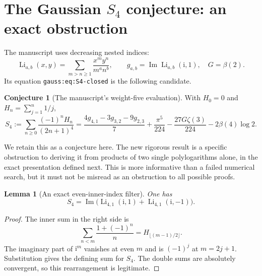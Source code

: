 \documentclass[11pt]{article}
\numberwithin{equation}{section}
\newtheorem{lemma}[theorem]{Lemma}
\theoremstyle{definition}
\newtheorem{conjecture}[theorem]{Conjecture}
\theoremstyle{remark}
\DeclareMathOperator{\Li}{Li}
\DeclareMathOperator{\Imm}{Im}
\newcommand{\ii}{\mathrm i}
\newcommand{\code}[1]{\texttt{\small #1}}
\begin{document}
\section{The Gaussian \texorpdfstring{$S_4$}{S4} conjecture: an exact obstruction}\label{sec:s4}

The manuscript uses decreasing nested indices:
\[
 \Li_{a,b}(x,y)=\sum_{m>n\ge1}\frac{x^my^n}{m^a n^b},\qquad
 g_{a,b}=\Imm\Li_{a,b}(\ii,1),\quad G=\beta(2).
\]
Its equation \code{gauss:eq:S4-closed} is the following candidate.

\begin{conjecture}[The manuscript's weight-five evaluation]\label{conj:S4}
With $H_0=0$ and $H_n=\sum_{j=1}^n1/j$,
\begin{equation}\label{eq:S4-conjecture}
 S_4:=\sum_{n\ge0}\frac{(-1)^nH_n}{(2n+1)^4}
 =\frac{4g_{4,1}-3g_{3,2}-9g_{2,3}}7
 +\frac{\pi^5}{224}-\frac{27G\zeta(3)}{224}
 -2\beta(4)\log2.
\end{equation}
\end{conjecture}

We retain this as a conjecture here. The new rigorous result is a
specific obstruction to deriving it from products of two single
polylogarithms alone, in the exact presentation defined next. This is
more informative than a failed numerical search, but it must not be
misread as an obstruction to all possible proofs.

\begin{lemma}[An exact even-inner-index filter]\label{lem:S4-filter}
One has
\begin{equation}\label{eq:S4-filter}
 S_4=\Imm\bigl(\Li_{4,1}(\ii,1)+\Li_{4,1}(\ii,-1)\bigr).
\end{equation}
\end{lemma}
\begin{proof}
The inner sum in the right side is
\[
 \sum_{n<m}\frac{1+(-1)^n}{n}=H_{\lfloor(m-1)/2\rfloor}.
\]
The imaginary part of $\ii^m$ vanishes at even $m$ and is $(-1)^j$
at $m=2j+1$. Substitution gives the defining sum for $S_4$.
The double sums are absolutely convergent, so this rearrangement is
legitimate.
\end{proof}
\end{document}
